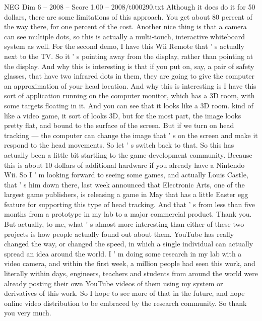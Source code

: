 \begin{textsample}{NEG Dim 6 – 2008 – Score 1.00 – 2008/t000290.txt}
Although it does do it for 50 dollars, there are some limitations of this approach.
You get about 80 percent of the way there, for one percent of the cost.
Another nice thing is that a camera can see multiple dots, so this is actually a multi-touch, interactive whiteboard system as well.
For the second demo, I have this Wii Remote that ' s actually next to the TV.
So it ' s pointing away from the display, rather than pointing at the display.
And why this is interesting is that if you put on, say, a pair of safety glasses, that have two infrared dots in them, they are going to give the computer an approximation of your head location.
And why this is interesting is I have this sort of application running on the computer monitor, which has a 3D room, with some targets floating in it.
And you can see that it looks like a 3D room. kind of like a video game, it sort of looks 3D, but for the most part, the image looks pretty flat, and bound to the surface of the screen.
But if we turn on head tracking — the computer can change the image that ' s on the screen and make it respond to the head movements.
So let ' s switch back to that.
So this has actually been a little bit startling to the game-development community.
Because this is about 10 dollars of additional hardware if you already have a Nintendo Wii.
So I ' m looking forward to seeing some games, and actually Louis Castle, that ' s him down there, last week announced that Electronic Arts, one of the largest game publishers, is releasing a game in May that has a little Easter egg feature for supporting this type of head tracking.
And that ' s from less than five months from a prototype in my lab to a major commercial product.
Thank you.
But actually, to me, what ' s almost more interesting than either of these two projects is how people actually found out about them.
YouTube has really changed the way, or changed the speed, in which a single individual can actually spread an idea around the world.
I ' m doing some research in my lab with a video camera, and within the first week, a million people had seen this work, and literally within days, engineers, teachers and students from around the world were already posting their own YouTube videos of them using my system or derivatives of this work.
So I hope to see more of that in the future, and hope online video distribution to be embraced by the research community.
So thank you very much.

\end{textsample}
